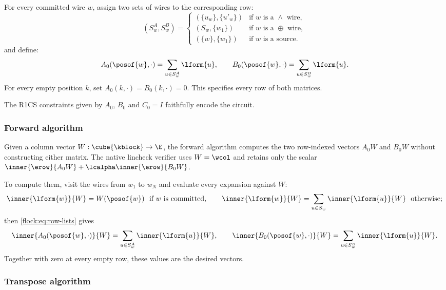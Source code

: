 For every committed wire $w$, assign two sets of wires to the corresponding row:
\[
(S^A_w,S^B_w)=
\begin{cases}
(\{u_w\},\{u'_w\}) & \text{if $w$ is a $\wedge$ wire},\\
(S_w,\{w_1\}) & \text{if $w$ is a $\oplus$ wire},\\
(\{w\},\{w_1\}) & \text{if $w$ is a source}.
\end{cases}
\]
and define:
\begin{equation}\label{flock:eq:row-lists}
A_0(\posof{w},\cdot)=\sum_{u\in S^A_w}\lform{u},\qquad B_0(\posof{w},\cdot)=\sum_{u\in S^B_w}\lform{u}.
\end{equation}
For every empty position $k$, set $A_0(k,\cdot)=B_0(k,\cdot)=0$. This specifies every row of both matrices.

\vspace{3mm}

The R1CS constraints given by $A_0$, $B_0$ and $C_0=I$ faithfully encode the circuit.
\subsubsection{Forward algorithm}\label{flock:forward}

Given a column vector $W:\cube{\kblock}\to\E$, the forward algorithm computes the two row-indexed vectors $A_0W$ and $B_0W$ without constructing either matrix. The native lincheck verifier uses $W=\wcol$ and retains only the scalar $\inner{\erow}{A_0W}+\lcalpha\inner{\erow}{B_0W}$.

To compute them, visit the wires from $w_1$ to $w_N$ and evaluate every expansion against $W$:
\[
\inner{\lform{w}}{W}=W(\posof{w})\ \text{ if $w$ is committed},\qquad \inner{\lform{w}}{W}=\sum_{u\in S_w}\inner{\lform{u}}{W}\ \text{ otherwise};
\]
then \eqref{flock:eq:row-lists} gives
\begin{equation}\label{flock:eq:row-pair}
\inner{A_0(\posof{w},\cdot)}{W}=\sum_{u\in S^A_w}\inner{\lform{u}}{W},\qquad \inner{B_0(\posof{w},\cdot)}{W}=\sum_{u\in S^B_w}\inner{\lform{u}}{W}.
\end{equation}
Together with zero at every empty row, these values are the desired vectors.

\subsubsection{Transpose algorithm}\label{flock:backward}

